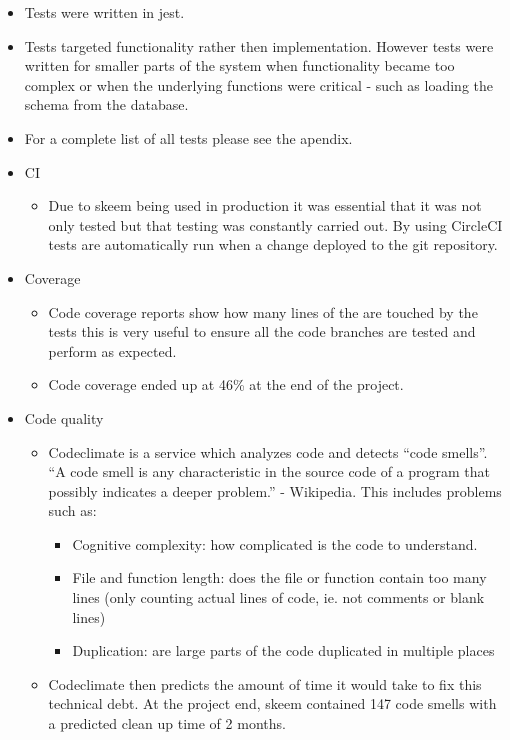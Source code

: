 \documentclass[
  12pt,
]{article}
\providecommand{\tightlist}{%
  \setlength{\itemsep}{0pt}\setlength{\parskip}{0pt}}
\begin{document}
\begin{itemize}
\tightlist
\item
  Tests were written in jest.
\item
  Tests targeted functionality rather then implementation. However tests
  were written for smaller parts of the system when functionality became
  too complex or when the underlying functions were critical - such as
  loading the schema from the database.
\item
  For a complete list of all tests please see the apendix.
\item
  CI

  \begin{itemize}
  \tightlist
  \item
    Due to skeem being used in production it was essential that it was
    not only tested but that testing was constantly carried out. By
    using CircleCI tests are automatically run when a change deployed to
    the git repository.
  \end{itemize}
\item
  Coverage

  \begin{itemize}
  \tightlist
  \item
    Code coverage reports show how many lines of the are touched by the
    tests this is very useful to ensure all the code branches are tested
    and perform as expected.
  \item
    Code coverage ended up at 46\% at the end of the project.
  \end{itemize}
\item
  Code quality

  \begin{itemize}
  \tightlist
  \item
    Codeclimate is a service which analyzes code and detects ``code
    smells''. ``A code smell is any characteristic in the source code of
    a program that possibly indicates a deeper problem.'' - Wikipedia.
    This includes problems such as:

    \begin{itemize}
    \tightlist
    \item
      Cognitive complexity: how complicated is the code to understand.
    \item
      File and function length: does the file or function contain too
      many lines (only counting actual lines of code, ie. not comments
      or blank lines)
    \item
      Duplication: are large parts of the code duplicated in multiple
      places
    \end{itemize}
  \item
    Codeclimate then predicts the amount of time it would take to fix
    this technical debt. At the project end, skeem contained 147 code
    smells with a predicted clean up time of 2 months.
  \end{itemize}
\end{itemize}
\end{document}
